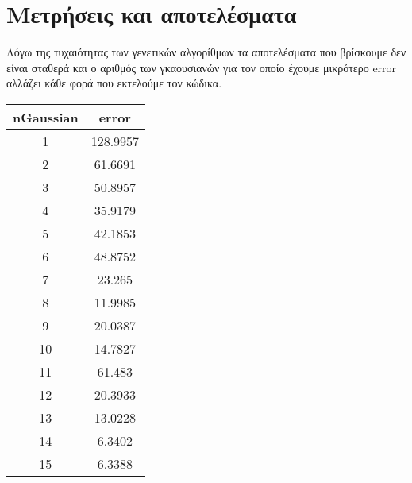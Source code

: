 \chapter{Μετρήσεις και αποτελέσματα} \label{ch:meashurements}

Λόγω της τυχαιότητας των γενετικών αλγορίθμων τα αποτελέσματα που βρίσκουμε δεν είναι σταθερά και ο αριθμός των γκαουσιανών για τον οποίο έχουμε μικρότερο error αλλάζει κάθε φορά που εκτελούμε τον κώδικα.
\newline

\begin{tabular}{ c | c }
   nGaussian & error \\
   \hline
	1 & 128.9957 \\ 
	2 & 61.6691 \\ 
	3 & 50.8957 \\ 
	4 & 35.9179 \\ 
	5 & 42.1853 \\ 
	6 & 48.8752 \\ 
	7 & 23.265 \\ 
	8 & 11.9985 \\ 
	9 & 20.0387 \\ 
	10 & 14.7827 \\ 
	11 & 61.483 \\ 
	12 & 20.3933 \\ 
	13 & 13.0228 \\ 
	14 & 6.3402 \\ 
	15 & 6.3388 \\ 
\end{tabular}

